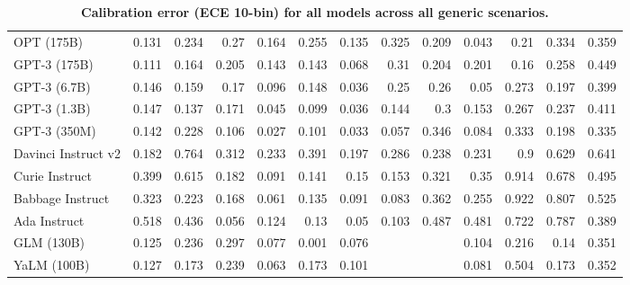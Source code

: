 \begin{table}[htp]
{\begin{tabular}{lrrrrrrrrrrrr}
OPT (175B) & 0.131 & 0.234 & 0.27 & 0.164 & 0.255 & 0.135 & 0.325 & 0.209 & 0.043 & 0.21 & 0.334 & 0.359 \\
GPT-3 (175B) & 0.111 & 0.164 & 0.205 & 0.143 & 0.143 & 0.068 & 0.31 & 0.204 & 0.201 & 0.16 & 0.258 & 0.449 \\
GPT-3 (6.7B) & 0.146 & 0.159 & 0.17 & 0.096 & 0.148 & 0.036 & 0.25 & 0.26 & 0.05 & 0.273 & 0.197 & 0.399 \\
GPT-3 (1.3B) & 0.147 & 0.137 & 0.171 & 0.045 & 0.099 & 0.036 & 0.144 & 0.3 & 0.153 & 0.267 & 0.237 & 0.411 \\
GPT-3 (350M) & 0.142 & 0.228 & 0.106 & 0.027 & 0.101 & 0.033 & 0.057 & 0.346 & 0.084 & 0.333 & 0.198 & 0.335 \\
Davinci Instruct v2 & 0.182 & 0.764 & 0.312 & 0.233 & 0.391 & 0.197 & 0.286 & 0.238 & 0.231 & 0.9 & 0.629 & 0.641 \\
Curie Instruct & 0.399 & 0.615 & 0.182 & 0.091 & 0.141 & 0.15 & 0.153 & 0.321 & 0.35 & 0.914 & 0.678 & 0.495 \\
Babbage Instruct & 0.323 & 0.223 & 0.168 & 0.061 & 0.135 & 0.091 & 0.083 & 0.362 & 0.255 & 0.922 & 0.807 & 0.525 \\
Ada Instruct & 0.518 & 0.436 & 0.056 & 0.124 & 0.13 & 0.05 & 0.103 & 0.487 & 0.481 & 0.722 & 0.787 & 0.389 \\
GLM (130B) & 0.125 & 0.236 & 0.297 & 0.077 & 0.001 & 0.076 &  &  & 0.104 & 0.216 & 0.14 & 0.351 \\
YaLM (100B) & 0.127 & 0.173 & 0.239 & 0.063 & 0.173 & 0.101 &  &  & 0.081 & 0.504 & 0.173 & 0.352 \\
\bottomrule
\end{tabular}}
\caption{\textbf{Calibration error (ECE 10-bin) for all models across all generic scenarios.}}
\label{tab:calibration-generic}
\end{table}